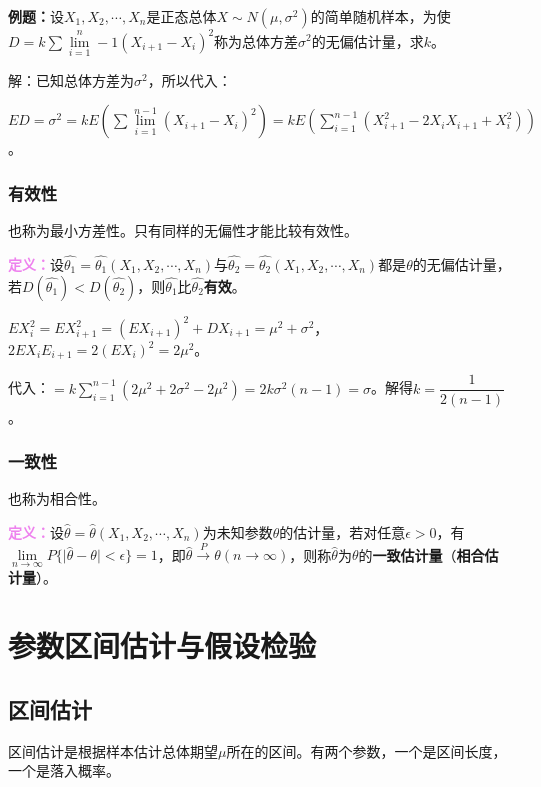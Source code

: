\documentclass[UTF8, 12pt]{ctexart}
\begin{document}
\textbf{例题：}设$X_1,X_2,\cdots,X_n$是正态总体$X\sim N(\mu,\sigma^2)$的简单随机样本，为使$D=k\sum\lim\limits_{i=1}^n-1(X_{i+1}-X_i)^2$称为总体方差$\sigma^2$的无偏估计量，求$k$。

解：已知总体方差为$\sigma^2$，所以代入：

$ED=\sigma^2=kE(\sum\lim\limits_{i=1}^{n-1}(X_{i+1}-X_i)^2)=kE(\sum\limits_{i=1}^{n-1}(X_{i+1}^2-2X_iX_{i+1}+X_i^2))$。

\subsubsection{有效性}

也称为最小方差性。只有同样的无偏性才能比较有效性。

\textcolor{violet}{\textbf{定义：}}设$\hat{\theta_1}=\hat{\theta_1}(X_1,X_2,\cdots,X_n)$与$\hat{\theta_2}=\hat{\theta_2}(X_1,X_2,\cdots,X_n)$都是$\theta$的无偏估计量，若$D(\hat{\theta_1})<D(\hat{\theta_2})$，则$\hat{\theta_1}$比$\hat{\theta_2}$\textbf{有效}。

$EX_i^2=EX_{i+1}^2=(EX_{i+1})^2+DX_{i+1}=\mu^2+\sigma^2$，$2EX_iE_{i+1}=2(EX_i)^2=2\mu^2$。

代入：$=k\sum\limits_{i=1}^{n-1}(2\mu^2+2\sigma^2-2\mu^2)=2k\sigma^2(n-1)=\sigma$。解得$k=\dfrac{1}{2(n-1)}$。

\subsubsection{一致性}

也称为相合性。

\textcolor{violet}{\textbf{定义：}}设$\hat{\theta}=\hat{\theta}(X_1,X_2,\cdots,X_n)$为未知参数$\theta$的估计量，若对任意$\epsilon>0$，有$\lim\limits_{n\to\infty}P\{\vert\hat{\theta}-\theta\vert<\epsilon\}=1$，即$\hat{\theta}\overset{P}{\longrightarrow}\theta(n\to\infty)$，则称$\hat{\theta}$为$\theta$的\textbf{一致估计量}（\textbf{相合估计量}）。

\section{参数区间估计与假设检验}

\subsection{区间估计}

区间估计是根据样本估计总体期望$\mu$所在的区间。有两个参数，一个是区间长度，一个是落入概率。
\end{document}
